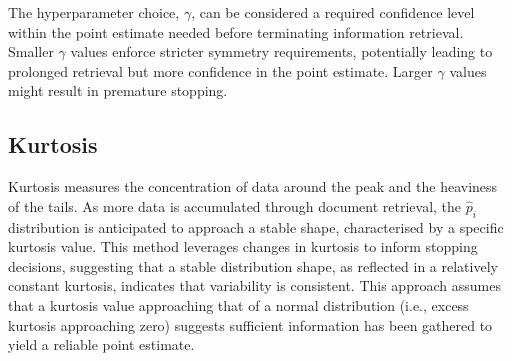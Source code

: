 \documentclass[sigconf,natbib=true,anonymous=true]{acmart}
\begin{document}
The hyperparameter choice, $\gamma$, can be considered a required confidence level within the point estimate needed before terminating information retrieval. Smaller $\gamma$ values enforce stricter symmetry requirements, potentially leading to prolonged retrieval but more confidence in the point estimate. Larger $\gamma$ values might result in premature stopping.



\subsection{Kurtosis}
Kurtosis measures the concentration of data around the peak and the heaviness of the tails. As more data is accumulated through document retrieval, the $\hat{p}_i$ distribution is anticipated to approach a stable shape, characterised by a specific kurtosis value. This method leverages changes in kurtosis to inform stopping decisions, suggesting that a stable distribution shape, as reflected in a relatively constant kurtosis, indicates that variability is consistent. This approach assumes that a kurtosis value approaching that of a normal distribution (i.e., excess kurtosis approaching zero) suggests sufficient information has been gathered to yield a reliable point estimate.
\end{document}
